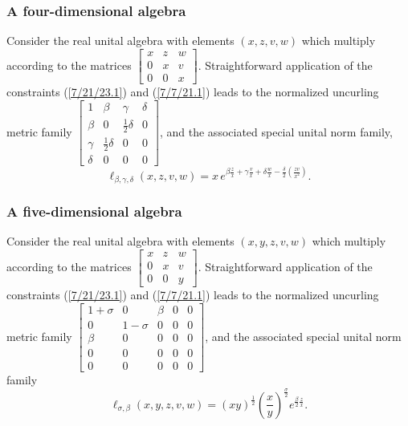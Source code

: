\documentclass{amsart}
\numberwithin{equation}{section}
\theoremstyle{definition}
\numberwithin{theorem}{section}
\begin{document}
 \subsubsection{A four-dimensional algebra} Consider the real unital algebra with elements 
$(x,z,v,w)$ which multiply according to the matrices 
$\left[
\begin{array}{ccccc}
x & z & w   \\
0 & x & v \\
0 & 0 & x  
\end{array}
\right]$.
Straightforward application of the constraints (\ref{7/21/23.1}) and (\ref{7/7/21.1}) leads to the normalized uncurling metric family 
$\left[
\begin{array}{cccc}
1 & \beta & \gamma & \delta   \\
\beta & 0 & \frac{1}{2}\delta & 0 \\
\gamma & \frac{1}{2}\delta &  0 & 0   \\
\delta & 0 &  0 & 0
\end{array}
\right]$, and the associated special unital norm family,
\[ \ell_{\beta,\gamma,\delta}(x,z,v,w) = x\, e^{\beta\frac{z}{x} + \gamma\frac{v}{x} +\delta\frac{w}{x}- \frac{\delta}{2}\left(\frac{zv}{x^2}\right)}.\]


\subsubsection{A five-dimensional algebra}Consider the real unital algebra with elements 
$(x,y,z,v,w)$ which multiply according to the matrices
$\left[
\begin{array}{ccccc}
x & z & w   \\
0 & x & v \\
0 & 0 & y  
\end{array}
\right]$.
Straightforward application of the constraints (\ref{7/21/23.1}) and (\ref{7/7/21.1}) leads to the normalized uncurling metric family 
$\left[
\begin{array}{ccccc}
1+\sigma & 0 & \beta & 0  & 0   \\
0 & 1-\sigma & 0 & 0 & 0 \\
\beta & 0 &  0 & 0 & 0  \\
 0 & 0 &  0 & 0 & 0  \\
0 & 0 &  0 & 0 & 0
\end{array}
\right]$, and the associated special unital norm family 
\[ \ell_{\sigma,\beta}(x,y,z,v,w) =  (xy)^{\frac{1}{2}}\left(\frac{x}{y}\right)^{\frac{\sigma}{2}} e^{\frac{\beta}{2} \frac{z}{x}}.\]
\end{document}
